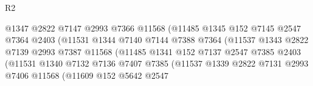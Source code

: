 \begin{lexlean}{R2}
\begin{coremodule}
                                        @1347
                                        @2822
                                        @7147
                                        @2993
                                        @7366
                                        @11568
                                        (@11485
                                          @1345
                                          @152
                                          @7145
                                          @2547
                                          @7364
                                          @2403
                                          (@11531
                                            @1344
                                            @7140
                                            @7144
                                            @7388
                                            @7364
                                            (@11537
                                              @1343
                                              @2822
                                              @7139
                                              @2993
                                              @7387
                                              @11568
                                              (@11485
                                                @1341
                                                @152
                                                @7137
                                                @2547
                                                @7385
                                                @2403
                                                (@11531
                                                  @1340
                                                  @7132
                                                  @7136
                                                  @7407
                                                  @7385
                                                  (@11537
                                                    @1339
                                                    @2822
                                                    @7131
                                                    @2993
                                                    @7406
                                                    @11568
                                                    (@11609
                                                      @152
                                                      @5642
                                                      @2547

\end{coremodule}
\end{lexlean}
